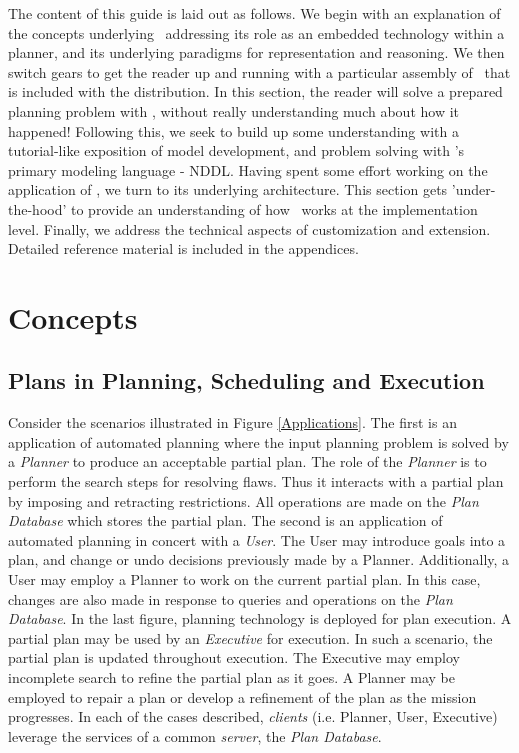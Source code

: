 \documentclass[10pt, letterpaper, twoside]{article}
\begin{document}
The content of this guide is laid out as follows. We begin with an
explanation of the concepts underlying \ET\, addressing its role as
an embedded technology within a planner, and its underlying paradigms
for representation and reasoning. We then switch gears to get the
reader up and running with a particular assembly of \ET\, that is
included with the distribution. In this section, the reader will solve
a prepared planning problem with \ET, without really understanding
much about how it happened! Following this, we seek to build up some
understanding with a tutorial-like exposition of model development,
and problem solving with \ET's primary modeling language -
NDDL. Having spent some effort working on the application of \ET,
we turn to its underlying architecture. This section gets
'under-the-hood' to provide an understanding of how \ET\, works at
the implementation level.  Finally, we address the technical aspects
of customization and extension. Detailed reference material is
included in the appendices.

\section{Concepts}
\label{concepts}

\subsection{Plans in Planning, Scheduling and Execution}
\label{plan-sched-exec}
Consider the scenarios illustrated in Figure \ref{Applications}. The first
is an application of automated planning where the input planning problem is
solved by a {\em Planner} to produce an acceptable partial plan. The role
of the {\em Planner} is to perform the search steps for resolving
flaws. Thus it interacts with a partial plan by imposing and retracting
restrictions. All operations are made on the {\em Plan Database} which
stores the partial plan.  The second is an application of automated
planning in concert with a {\em User}. The User may introduce goals into a
plan, and change or undo decisions previously made by a
Planner. Additionally, a User may employ a Planner to work on the current
partial plan.  In this case, changes are also made in response to queries
and operations on the {\em Plan Database}.  In the last figure, planning
technology is deployed for plan execution. A partial plan may be used by an
{\em Executive} for execution. In such a scenario, the partial plan is
updated throughout execution. The Executive may employ incomplete search to
refine the partial plan as it goes. A Planner may be employed to repair a
plan or develop a refinement of the plan as the mission progresses. In each
of the cases described, {\em clients} (i.e. Planner, User, Executive)
leverage the services of a common {\em server}, the {\em Plan Database}.
\begin{figure*}[t]
\centering{}
\caption{Sample Plan Database Applications}
\label{Applications}
\end{figure*}
\end{document}
